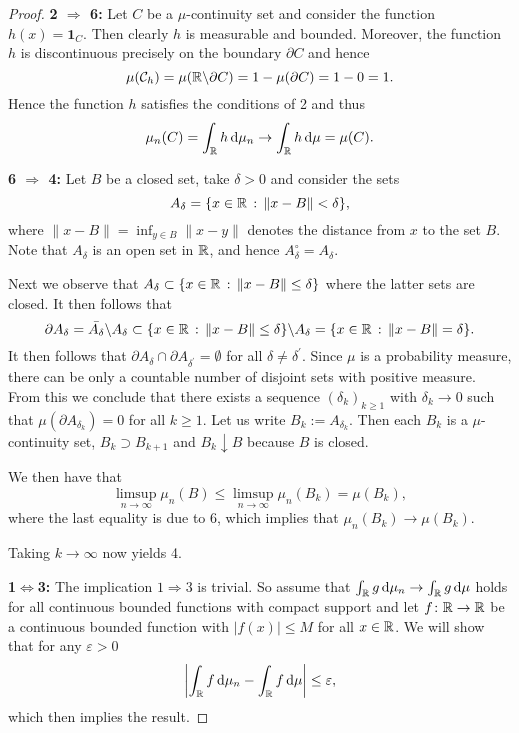 \begin{proof}
\textbf{2 $\Rightarrow$ 6:} Let $C$ be a $\mu$-continuity set and consider the function $h(x) = \mathbf{1}_{C}$. Then clearly $h$ is measurable and bounded. Moreover, the function $h$ is discontinuous precisely on the boundary $\partial C$ and hence
\[
	\mu(\mathcal C_h) =\mu(\mathbb R \backslash \partial C) = 1 - \mu(\partial C) = 1-0 = 1.
\]
Hence the function $h$ satisfies the conditions of 2 and thus
\[
	\mu_n(C) = \int_{\mathbb R} h \, \mathrm{d} \mu_n \to \int_{\mathbb R} h \, \mathrm{d} \mu = \mu(C).
\]


\textbf{6 $\Rightarrow$ 4:} Let $B$ be a closed set, take $\delta > 0$ and consider the sets
\[
	A_\delta = \{x \in \mathbb R \, : \, \|x - B\| < \delta\},
\]
where $\|x - B\| = \inf_{y \in B} \|x - y\|$ denotes the distance from $x$ to the set $B$. Note that $A_\delta$ is an open set in $\mathbb R$, and hence $A_\delta^\circ = A_\delta$.

Next we observe that $A_\delta \subset \{x \in \mathbb R \, : \, \|x-B\| \le \delta\}$ where the latter sets are closed. It then follows that
\[
	\partial A_\delta = \bar{A_\delta} \backslash A_\delta \subset \{x \in \mathbb R \, : \, \|x-B\| \le \delta\} \backslash A_\delta = \{x \in \mathbb R \, : \, \|x-B\| = \delta\}.
\]
It then follows that $\partial A_\delta \cap \partial A_{\delta^\prime} = \emptyset$ for all $\delta \ne \delta^\prime$. Since $\mu$ is a probability measure, there can be only a countable number of disjoint sets with positive measure. From this we conclude that there exists a sequence $(\delta_k)_{k \ge 1}$ with $\delta_k \to 0$ such that $\mu(\partial A_{\delta_k}) = 0$ for all $k \ge 1$. Let us write $B_k := A_{\delta_k}$. Then each $B_k$ is a $\mu$-continuity set, $B_k \supset B_{k + 1}$ and $B_k \downarrow B$ because $B$ is closed.

We then have that
\[
	\limsup_{n \to \infty} \mu_n(B) \le \limsup_{n \to \infty} \mu_n(B_k) = \mu(B_k),
\]
where the last equality is due to 6, which implies that $\mu_n(B_k) \to \mu(B_k)$.

Taking $k \to \infty$ now yields 4.

\textbf{1$\iff$3:} The implication $1 \Rightarrow 3$ is trivial. So assume that $\int_{\mathbb R} g \, \mathrm{d} \mu_n \to \int_{\mathbb R} g \, \mathrm{d} \mu$ holds for all continuous bounded functions with compact support and let $f\colon \mathbb R \to \mathbb R$ be a continuous bounded function with $|f(x)| \le M$ for all $x \in \mathbb R$. We will show that for any $\varepsilon > 0$
\[
	\left|\int_{\mathbb R} f \, \mathrm{d} \mu_n - \int_{\mathbb R} f \, \mathrm{d} \mu\right| \le \varepsilon,
\]
which then implies the result.


\end{proof}
